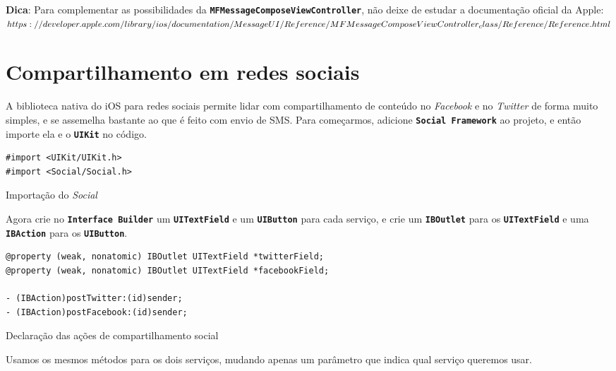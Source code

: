 \documentclass[a4paper,12pt,brazil,doubleside]{book}
\begin{document}
\begin{singlespace}
\begin{framed}

\textbf{Dica}: Para complementar as possibilidades da \texttt{\textbf{MFMessageComposeViewController}}, não deixe de estudar a documentação oficial da Apple:\\
\(https://developer.apple.com/library/ios/documentation/MessageUI/Reference/\\MFMessageComposeViewController_class/Reference/Reference.html\)
\end{framed}


\section{Compartilhamento em redes sociais}


A biblioteca nativa do iOS para redes sociais permite lidar com compartilhamento de conteúdo no \emph{Facebook} e no \emph{Twitter} de forma muito simples, e se assemelha bastante ao que é feito com envio de SMS. Para começarmos, adicione \texttt{\textbf{Social Framework}} ao projeto, e então importe ela e o \texttt{\textbf{UIKit}} no código.

\begin{listing}[H]
\begin{verbatim}
#import <UIKit/UIKit.h>
#import <Social/Social.h>
\end{verbatim}
\caption{Importação do \emph{Social}}
\end{listing}


Agora crie no \texttt{\textbf{Interface Builder}} um \texttt{\textbf{UITextField}} e um \texttt{\textbf{UIButton}} para cada serviço, e crie um \texttt{\textbf{IBOutlet}} para os \texttt{\textbf{UITextField}} e uma \texttt{\textbf{IBAction}} para os \texttt{\textbf{UIButton}}.

\begin{listing}[H]
\begin{verbatim}
@property (weak, nonatomic) IBOutlet UITextField *twitterField;
@property (weak, nonatomic) IBOutlet UITextField *facebookField;

- (IBAction)postTwitter:(id)sender;
- (IBAction)postFacebook:(id)sender;
\end{verbatim}
\caption{Declaração das ações de compartilhamento social}
\end{listing}


Usamos os mesmos métodos para os dois serviços, mudando apenas um parâmetro que indica qual serviço queremos usar.


\end{singlespace}
\end{document}
